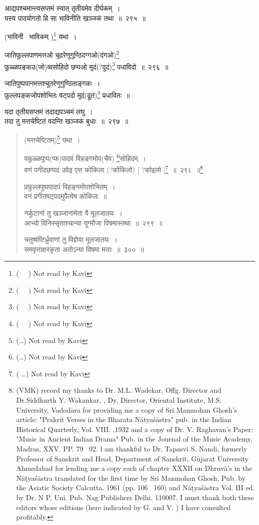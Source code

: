 \documentclass[11pt, openany]{book}
\begin{document}
{\na आद्यपश्चमान्त्यसप्तमं स्यात् तृतीयमेव दीर्घकम्~। \\
यस्य पादयोगतो हि सा भाविनीति खञ्जकं तथा~॥~२९५~॥} 

(भाविनी \textendash\ भाविकम् )\renewcommand{\thefootnote}{8}\footnote{( \textendash\ \textendash\ \textendash ) Not read by Kavi} यथा~। 

{\na जातिफुल्लपाणमत्तओ चूदरेणुगुण्ठिदग्गओ(दंगओ)\renewcommand{\thefootnote}{9}\footnote{( \textendash\ \textendash\ \textendash ) Not read by Kavi}\\
फुळ्ळपङ्कउ(जो)व्वसोहिदो छप्पओ मुदं(?दुदं)\renewcommand{\thefootnote}{10}\footnote{( \textendash\ \textendash\ \textendash ) Not read by Kavi} पधाविदो~॥~२९६~॥}

{\qt जातिपुष्पपानमत्तश्चूतरेणुगुण्ठिताङ्गकः~। \\
फुल्लपङ्कजोपशोभितः षट्पदो मुदं(द्रूतं)\renewcommand{\thefootnote}{11}\footnote{( \textendash\ \textendash\ \textendash ) Not read by Kavi} प्रधावितः~॥}

{\qt यदा तृतीयसप्तमं तदाद्यपञ्चमं लघु~। \\
तदा तु मत्तचेष्टितं वदन्ति खञ्जकं बुधाः~॥~२९७~॥}

\newpage

\begin{quote}
(मत्तचेष्टितम्)\renewcommand{\thefootnote}{1}\footnote{(\ldots) Not read by Kavi} यथा~। 

{\na पफुळ्ळपुप्प(प्फ)पादवं विहङ्गमोप(चैव) \renewcommand{\thefootnote}{2}\footnote{(\ldots ) Not read by Kavi}सोहिदम्~। \\
 वणं पगीदछप्पदं उवेइ एस कोकिला (?कोकिलो) [ ?कोइलो ]\renewcommand{\thefootnote}{3}\footnote{( \ldots ) Not read by Kavi}~॥~२९८~॥\renewcommand{\thefootnote}{*}\footnote{(VMK) record my thanks to Dr. M.L. Wadekar, Offg. Director and Dr.Siddharth Y. Wakankar, , Dy, Director, Oriental Institute, M.S. University, Vadodara for providing me a copy of Sri Manmohan Ghosh's article: "Prakrit Verses in the Bharata Nātyaśāstra" pub. in the Indian Historical Quarterly, Vol. VIII. ,1932 and a copy of Dr. V. Raghavan's Paper: "Music in Ancient Indian Drama" Pub. in the Journal of the Music Academy, Madras, XXV. PP. 79 \textendash\ 92. l am thankful to Dr. Tapasvi S. Nandi, formerly Professor of Sanskrit and Head, Department of Sanskrit, Gujarat University Ahmedabad for lending me a copy each of chapter XXXII on Dhruvā's in the Nāṭyaśāstra translated for the first time by Sri Manmohan Ghosh, Pub. by the Asiatic Society Calcutta. 1961 (pp. 106 \textendash\ 160) and Nāṭyaśāstra Vol. III ed. by Dr. N P. Uni. Pub. Nag Publishers Delhi. 110007. I must thank both these editors whose editions (here indicated by G. and V. ) I have consulted profitably.}

प्रफुल्लपुष्पपादपं विहङ्गमोपशोभितम्~।\\
 वनं प्रगीतषट्पदमुपैत्येष कोकिलः~॥

नर्कुटानां तु खञ्जानामेता वै मूलजातयः~।\\
 आभ्यो विनिस्सृताश्चान्या युग्मौजा विषमास्तथा~॥~२९९~॥

 चतुष्षष्टिर्ध्रुवाणां तु विज्ञेया मूलजातयः~। \\
 समवृत्ताक्षरकृता अतोऽन्या विषमा मताः~॥~३००~॥}
\end{quote}
\end{document}
